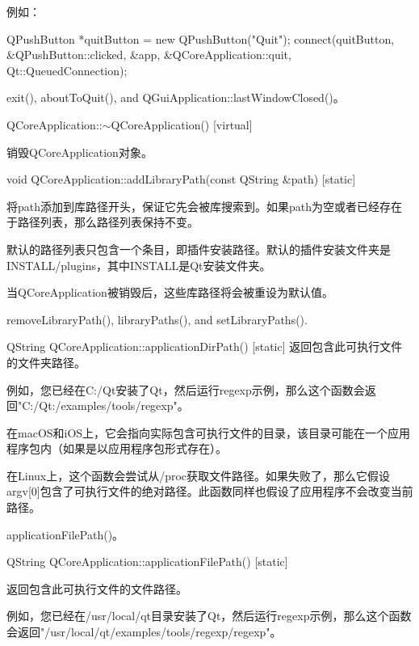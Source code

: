 例如：

\begin{cppcode}
QPushButton *quitButton = new QPushButton("Quit");
connect(quitButton, &QPushButton::clicked, &app, &QCoreApplication::quit, Qt::QueuedConnection);
\end{cppcode}

\begin{seeAlso}
exit(), aboutToQuit(), and QGuiApplication::lastWindowClosed()。
\end{seeAlso}


QCoreApplication::$\sim$QCoreApplication() [virtual]

销毁QCoreApplication对象。

void QCoreApplication::addLibraryPath(const QString \&path) [static]

将path添加到库路径开头，保证它先会被库搜索到。如果path为空或者已经存在于路径列表，那么路径列表保持不变。

默认的路径列表只包含一个条目，即插件安装路径。默认的插件安装文件夹是INSTALL/plugins，其中INSTALL是Qt安装文件夹。

当QCoreApplication被销毁后，这些库路径将会被重设为默认值。

\begin{seeAlso}
removeLibraryPath(), libraryPaths(), and setLibraryPaths().
\end{seeAlso}

QString QCoreApplication::applicationDirPath() [static]
返回包含此可执行文件的文件夹路径。

例如，您已经在C:/Qt安装了Qt，然后运行regexp示例，那么这个函数会返回"C:/Qt:/examples/tools/regexp"。

在macOS和iOS上，它会指向实际包含可执行文件的目录，该目录可能在一个应用程序包内（如果是以应用程序包形式存在）。

\begin{warning}
在Linux上，这个函数会尝试从/proc获取文件路径。如果失败了，那么它假设argv[0]包含了可执行文件的绝对路径。此函数同样也假设了应用程序不会改变当前路径。
\end{warning}

\begin{seeAlso}
applicationFilePath()。
\end{seeAlso}


QString QCoreApplication::applicationFilePath() [static]

返回包含此可执行文件的文件路径。

例如，您已经在/usr/local/qt目录安装了Qt，然后运行regexp示例，那么这个函数会返回"/usr/local/qt/examples/tools/regexp/regexp"。


